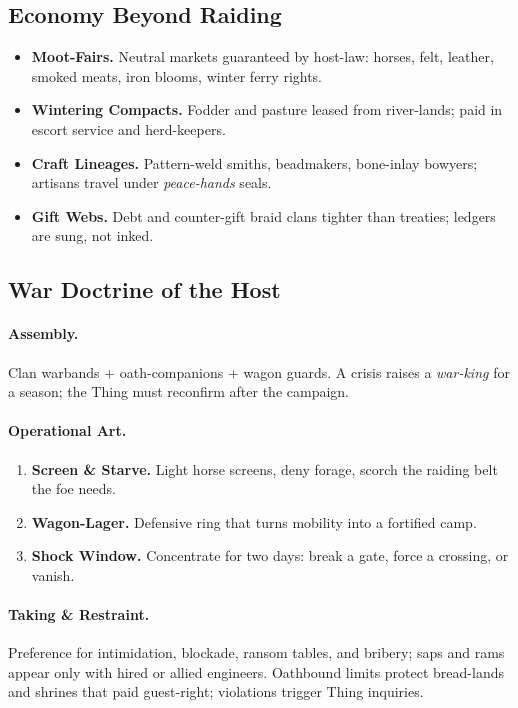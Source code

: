 \documentclass[11pt,letterpaper]{article}
\begin{document}
\subsection*{Economy Beyond Raiding}
\begin{itemize}
  \item \textbf{Moot-Fairs.} Neutral markets guaranteed by host-law: horses, felt, leather, smoked meats, iron blooms, winter ferry rights.
  \item \textbf{Wintering Compacts.} Fodder and pasture leased from river-lands; paid in escort service and herd-keepers.
  \item \textbf{Craft Lineages.} Pattern-weld smiths, beadmakers, bone-inlay bowyers; artisans travel under \emph{peace-hands} seals.
  \item \textbf{Gift Webs.} Debt and counter-gift braid clans tighter than treaties; ledgers are sung, not inked.
\end{itemize}

\subsection*{War Doctrine of the Host}
\paragraph{Assembly.} Clan warbands + oath-companions + wagon guards. A crisis raises a \emph{war-king} for a season; the Thing must reconfirm after the campaign.

\paragraph{Operational Art.}
\begin{enumerate}
  \item \textbf{Screen \& Starve.} Light horse screens, deny forage, scorch the raiding belt the foe needs.
  \item \textbf{Wagon-Lager.} Defensive ring that turns mobility into a fortified camp.
  \item \textbf{Shock Window.} Concentrate for two days: break a gate, force a crossing, or vanish.
\end{enumerate}

\paragraph{Taking \& Restraint.} Preference for intimidation, blockade, ransom tables, and bribery; saps and rams appear only with hired or allied engineers. Oathbound limits protect bread-lands and shrines that paid guest-right; violations trigger Thing inquiries.
\end{document}
